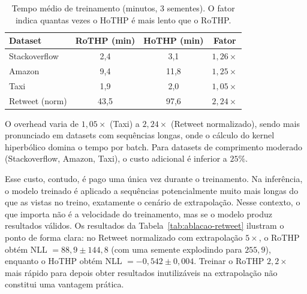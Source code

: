 \begin{table}[h!]
\centering
\caption{Tempo médio de treinamento (minutos, 3 sementes). O fator indica quantas vezes o HoTHP é mais lento que o RoTHP.}
\label{tab:tempo-treino}
\begin{tabular}{lccc}
\toprule
Dataset & RoTHP (min) & HoTHP (min) & Fator \\
\midrule
Stackoverflow  &  2,4 &  3,1 & $1{,}26\times$ \\
Amazon         &  9,4 & 11,8 & $1{,}25\times$ \\
Taxi           &  1,9 &  2,0 & $1{,}05\times$ \\
Retweet (norm) & 43,5 & 97,6 & $2{,}24\times$ \\
\bottomrule
\end{tabular}
\end{table}

O overhead varia de $1{,}05\times$ (Taxi) a $2{,}24\times$ (Retweet normalizado), sendo mais pronunciado em datasets com sequências longas, onde o cálculo do kernel hiperbólico domina o tempo por batch. Para datasets de comprimento moderado (Stackoverflow, Amazon, Taxi), o custo adicional é inferior a $25\%$.

Esse custo, contudo, é pago uma única vez durante o treinamento. Na inferência, o modelo treinado é aplicado a sequências potencialmente muito mais longas do que as vistas no treino, exatamente o cenário de extrapolação. Nesse contexto, o que importa não é a velocidade do treinamento, mas se o modelo produz resultados válidos. Os resultados da Tabela~\ref{tab:ablacao-retweet} ilustram o ponto de forma clara: no Retweet normalizado com extrapolação $5\times$, o RoTHP obtém NLL $= 88{,}9 \pm 144{,}8$ (com uma semente explodindo para $255{,}9$), enquanto o HoTHP obtém NLL $= -0{,}542 \pm 0{,}004$. Treinar o RoTHP $2{,}2\times$ mais rápido para depois obter resultados inutilizáveis na extrapolação não constitui uma vantagem prática.
